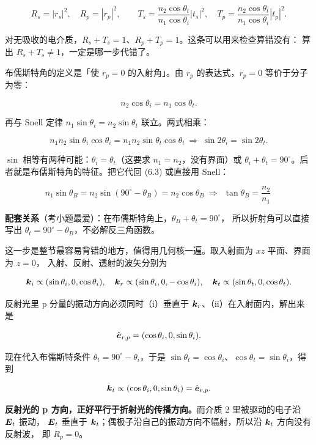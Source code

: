 \documentclass[11pt]{ctexart}
\let\subhdrtheme\subhdr
\renewcommand{\subhdr}[1]{\needspace{4\baselineskip}\subhdrtheme{#1}}
\begin{document}
\[
R_s=|r_s|^2,\quad R_p=|r_p|^2,
\qquad
T_s=\frac{n_2\cos\theta_t}{n_1\cos\theta_i}|t_s|^2,\quad
T_p=\frac{n_2\cos\theta_t}{n_1\cos\theta_i}|t_p|^2 .
\]

对无吸收的电介质，$R_s+T_s=1$、$R_p+T_p=1$。这条可以用来检查算错没有：
算出 $R_s+T_s\neq1$，一定是哪一步代错了。


布儒斯特角的定义是「使 $r_p=0$ 的入射角」。由 $r_p$ 的表达式，$r_p=0$ 等价于分子为零：

\[
n_2\cos\theta_i=n_1\cos\theta_t. \tag{6.3}
\]

再与 Snell 定律 $n_1\sin\theta_i=n_2\sin\theta_t$ 联立。两式相乘：

\[
n_1n_2\sin\theta_i\cos\theta_i=n_1n_2\sin\theta_t\cos\theta_t
\ \Longrightarrow\
\sin 2\theta_i=\sin 2\theta_t .
\]

$\sin$ 相等有两种可能：$\theta_i=\theta_t$（这要求 $n_1=n_2$，没有界面）或
$\theta_i+\theta_t=90^\circ$。后者就是布儒斯特角的特征。把它代回 (6.3) 或直接用 Snell：

\[
n_1\sin\theta_B=n_2\sin(90^\circ-\theta_B)=n_2\cos\theta_B
\ \Longrightarrow\
\boxed{\ \tan\theta_B=\frac{n_2}{n_1}\ }
\]

\textbf{配套关系}（考小题最爱）：在布儒斯特角上，$\theta_B+\theta_t=90^\circ$，
所以折射角可以直接写出 $\theta_t=90^\circ-\theta_B$，不必解反三角函数。


这一步是整节最容易背错的地方，值得用几何核一遍。取入射面为 $xz$ 平面、界面为 $z=0$，
入射、反射、透射的波矢分别为

\[
\boldsymbol{k}_i\propto(\sin\theta_i,0,\cos\theta_i),\quad
\boldsymbol{k}_r\propto(\sin\theta_i,0,-\cos\theta_i),\quad
\boldsymbol{k}_t\propto(\sin\theta_t,0,\cos\theta_t).
\]

反射光里 p 分量的振动方向必须同时（i）垂直于 $\boldsymbol{k}_r$、（ii）在入射面内，解出来是

\[
\hat{\boldsymbol{e}}_{r,p}=(\cos\theta_i,0,\sin\theta_i).
\]

现在代入布儒斯特条件 $\theta_t=90^\circ-\theta_i$，于是 $\sin\theta_t=\cos\theta_i$、$\cos\theta_t=\sin\theta_i$，得到

\[
\boldsymbol{k}_t\propto(\cos\theta_i,0,\sin\theta_i)=\hat{\boldsymbol{e}}_{r,p}.
\]

\textbf{反射光的 p 方向，正好平行于折射光的传播方向。}而介质 2 里被驱动的电子沿 $\boldsymbol{E}_t$ 振动，
$\boldsymbol{E}_t$ 垂直于 $\boldsymbol{k}_t$；偶极子沿自己的振动方向不辐射，所以沿 $\boldsymbol{k}_t$ 方向没有反射波，
即 $R_p=0$。
\end{document}

